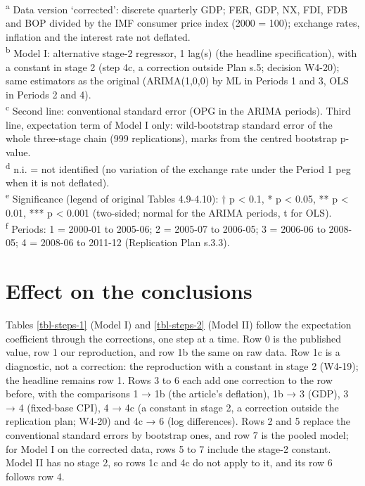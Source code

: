 \documentclass[
  12pt,
  a4paper,
]{article}
\begin{document}
\textsuperscript{a} Data version `corrected': discrete quarterly GDP;
FER, GDP, NX, FDI, FDB and BOP divided by the IMF consumer price index
(2000 = 100); exchange rates, inflation and the interest rate not
deflated.\\
\textsuperscript{b} Model I: alternative stage-2 regressor, 1 lag(s)
(the headline specification), with a constant in stage 2 (step 4c, a
correction outside Plan s.5; decision W4-20); same estimators as the
original (ARIMA(1,0,0) by ML in Periods 1 and 3, OLS in Periods 2 and
4).\\
\textsuperscript{c} Second line: conventional standard error (OPG in the
ARIMA periods). Third line, expectation term of Model I only:
wild-bootstrap standard error of the whole three-stage chain (999
replications), marks from the centred bootstrap p-value.\\
\textsuperscript{d} n.i. = not identified (no variation of the exchange
rate under the Period 1 peg when it is not deflated).\\
\textsuperscript{e} Significance (legend of original Tables 4.9-4.10): †
p \textless{} 0.1, * p \textless{} 0.05, ** p \textless{} 0.01, *** p
\textless{} 0.001 (two-sided; normal for the ARIMA periods, t for
OLS).\\
\textsuperscript{f} Periods: 1 = 2000-01 to 2005-06; 2 = 2005-07 to
2006-05; 3 = 2006-06 to 2008-05; 4 = 2008-06 to 2011-12 (Replication
Plan s.3.3).

\section{Effect on the conclusions}\label{sec-effect}

Tables \ref{tbl-steps-1} (Model I) and \ref{tbl-steps-2} (Model II)
follow the expectation coefficient through the corrections, one step at
a time. Row 0 is the published value, row 1 our reproduction, and row 1b
the same on raw data. Row 1c is a diagnostic, not a correction: the
reproduction with a constant in stage 2 (W4-19); the headline remains
row 1. Rows 3 to 6 each add one correction to the row before, with the
comparisons 1 → 1b (the article's deflation), 1b → 3 (GDP), 3 → 4
(fixed-base CPI), 4 → 4c (a constant in stage 2, a correction outside
the replication plan; W4-20) and 4c → 6 (log differences). Rows 2 and 5
replace the conventional standard errors by bootstrap ones, and row 7 is
the pooled model; for Model I on the corrected data, rows 5 to 7 include
the stage-2 constant. Model II has no stage 2, so rows 1c and 4c do not
apply to it, and its row 6 follows row 4.
\end{document}
